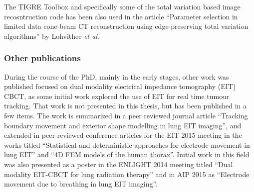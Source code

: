 The TIGRE Toolbox and specifically some of the total variation based image recosntruction code has been also used in the article ``Parameter selection in limited data cone-beam CT reconstruction using edge-preserving total variation algorithms'' by Lohvithee \textit{et al}\cite{Vee}.

\subsubsection{Other publications}

During the course of the PhD, mainly in the early stages, other work was published focused on dual modality electrical impedance tomography (EIT) CBCT, as some initial work explored the use of EIT for real time tumour tracking. That work is not presented in this thesis, but has been published in a few items. The work is summarized in a peer reviewed journal article ``Tracking boundary movement and exterior shape modelling in lung EIT imaging''\cite{biguri2015tracking}, and extended in peer-reviewed conference articles for the EIT 2015 meeting in the works titled ``Statistical and deterministic approaches for electrode movement in lung EIT''\cite{biguri2015statistical} and ``4D FEM models of the human thorax''\cite{biguri20154d}. Initial work in this field was also presented as a poster in the ENLIGHT 2014 meeting titled ``Dual modality EIT-CBCT for lung radiation therapy''\cite{biguri2015dual} and in AIP 2015 as ``Electrode movement due to breathing in lung EIT imaging''\cite{biguri2015electrode}.





